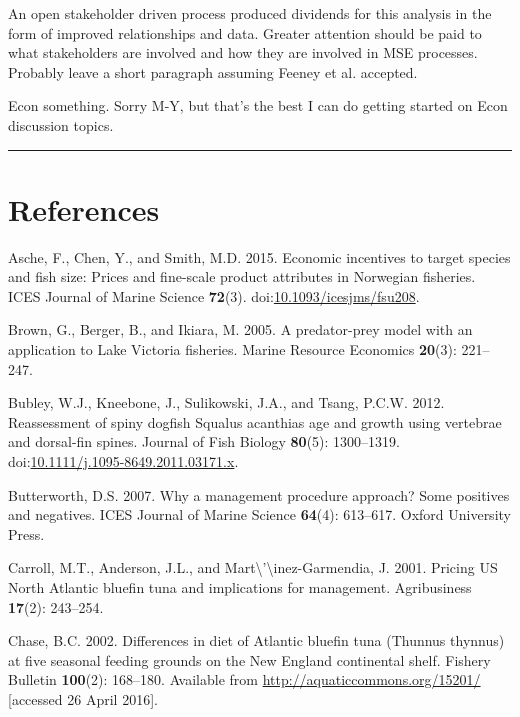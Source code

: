 \documentclass[]{article}
\begin{document}
An open stakeholder driven process produced dividends for this analysis
in the form of improved relationships and data. Greater attention should
be paid to what stakeholders are involved and how they are involved in
MSE processes. Probably leave a short paragraph assuming Feeney et al.
accepted.

Econ something. Sorry M-Y, but that's the best I can do getting started
on Econ discussion topics.

\begin{center}\rule{0.5\linewidth}{\linethickness}\end{center}

\section*{References}\label{references}

\hypertarget{refs}{}
\hypertarget{ref-Asche2015EconomicFisheries}{}
Asche, F., Chen, Y., and Smith, M.D. 2015. Economic incentives to target
species and fish size: Prices and fine-scale product attributes in
Norwegian fisheries. ICES Journal of Marine Science \textbf{72}(3).
doi:\href{https://doi.org/10.1093/icesjms/fsu208}{10.1093/icesjms/fsu208}.

\hypertarget{ref-Brown2005AFisheries}{}
Brown, G., Berger, B., and Ikiara, M. 2005. A predator-prey model with
an application to Lake Victoria fisheries. Marine Resource Economics
\textbf{20}(3): 221--247.

\hypertarget{ref-bubley_reassessment_2012}{}
Bubley, W.J., Kneebone, J., Sulikowski, J.A., and Tsang, P.C.W. 2012.
Reassessment of spiny dogfish Squalus acanthias age and growth using
vertebrae and dorsal-fin spines. Journal of Fish Biology \textbf{80}(5):
1300--1319.
doi:\href{https://doi.org/10.1111/j.1095-8649.2011.03171.x}{10.1111/j.1095-8649.2011.03171.x}.

\hypertarget{ref-butterworth2007management}{}
Butterworth, D.S. 2007. Why a management procedure approach? Some
positives and negatives. ICES Journal of Marine Science \textbf{64}(4):
613--617. Oxford University Press.

\hypertarget{ref-Carroll2001PricingManagement}{}
Carroll, M.T., Anderson, J.L., and
Mart\textbackslash{}'\textbackslash{}inez-Garmendia, J. 2001. Pricing US
North Atlantic bluefin tuna and implications for management.
Agribusiness \textbf{17}(2): 243--254.

\hypertarget{ref-chase_differences_2002}{}
Chase, B.C. 2002. Differences in diet of Atlantic bluefin tuna (Thunnus
thynnus) at five seasonal feeding grounds on the New England continental
shelf. Fishery Bulletin \textbf{100}(2): 168--180. Available from
\url{http://aquaticcommons.org/15201/} {[}accessed 26 April 2016{]}.
\end{document}
